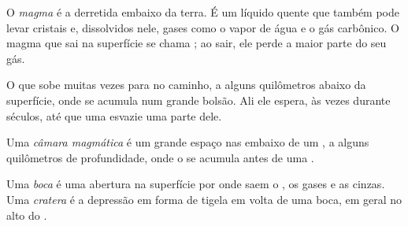 \begin{definition}[Magma]\label{def:g7:volcanoes:magma}
O \emph{magma} é a  derretida embaixo da terra. É um
líquido quente que também pode levar cristais e, dissolvidos nele, gases
como o vapor de água e o gás carbônico. O magma que sai na superfície se
chama ; ao sair, ele perde a maior parte do seu gás.
\end{definition}

O  que sobe muitas vezes para no caminho, a alguns quilômetros
abaixo da superfície, onde se acumula num grande bolsão. Ali ele espera,
às vezes durante séculos, até que uma  esvazie uma parte dele.

\begin{definition}\label{def:g7:volcanoes:magma-chamber}
Uma \emph{câmara magmática} é um grande espaço
nas  embaixo de um , a alguns quilômetros de profundidade, onde
o  se acumula antes de uma .
\end{definition}

\begin{definition}\label{def:g7:volcanoes:vent}
Uma \emph{boca} é uma abertura na superfície por onde saem o
, os gases e as cinzas. Uma \emph{cratera} é a depressão em
forma de tigela em volta de uma boca, em geral no alto do .
\end{definition}

